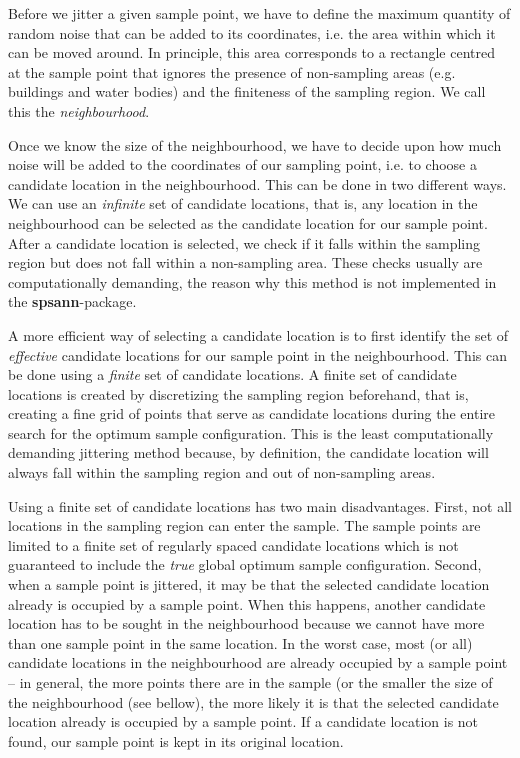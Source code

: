 Before we jitter a given sample point, we have to define the maximum quantity 
of random noise that can be added to its coordinates, i.e. the area within 
which it can be moved around. In principle, this area corresponds to a rectangle
centred at the sample point that ignores the presence of non-sampling areas 
(e.g. buildings and water bodies) and the finiteness of the sampling region. We 
call this the \textit{neighbourhood}.

Once we know the size of the neighbourhood, we have to decide upon how much 
noise will be added to the coordinates of our sampling point, i.e. to choose a
candidate location in the neighbourhood. This can be done in two different ways.
We can use an \textit{infinite} set of candidate locations, that is, any 
location in the neighbourhood can be selected as the candidate location for our 
sample point. After a candidate location is selected, we check if it falls 
within the sampling region but does not fall within a non-sampling area. These 
checks usually are computationally demanding, the reason why this method is not 
implemented in the \textbf{spsann}-package.

A more efficient way of selecting a candidate location is to first identify the
set of \textit{effective} candidate locations for our sample point in the 
neighbourhood. This can be done using a \textit{finite} set of candidate 
locations. A finite set of candidate locations is created by discretizing the 
sampling region beforehand, that is, creating a fine grid of points that serve 
as candidate locations during the entire search for the optimum sample 
configuration. This is the least computationally demanding jittering method 
because, by definition, the candidate location will always fall within the 
sampling region and out of non-sampling areas.

Using a finite set of candidate locations has two main disadvantages. First, not
all locations in the sampling region can enter the sample. The sample points are
limited to a finite set of regularly spaced candidate locations which is not 
guaranteed to include the \textit{true} global optimum sample configuration. 
Second, when a sample point is jittered, it may be that the selected candidate 
location already is occupied by a sample point. When this happens, another 
candidate location has to be sought in the neighbourhood because we cannot have 
more than one sample point in the same location. In the worst case, most (or 
all) candidate locations in the neighbourhood are already occupied by a sample 
point -- in general, the more points there are in the sample (or the smaller 
the size of the neighbourhood (see bellow), the more likely it is that the 
selected candidate location already is occupied by a sample point. If a 
candidate location is not found, our sample point is kept in its original 
location.

